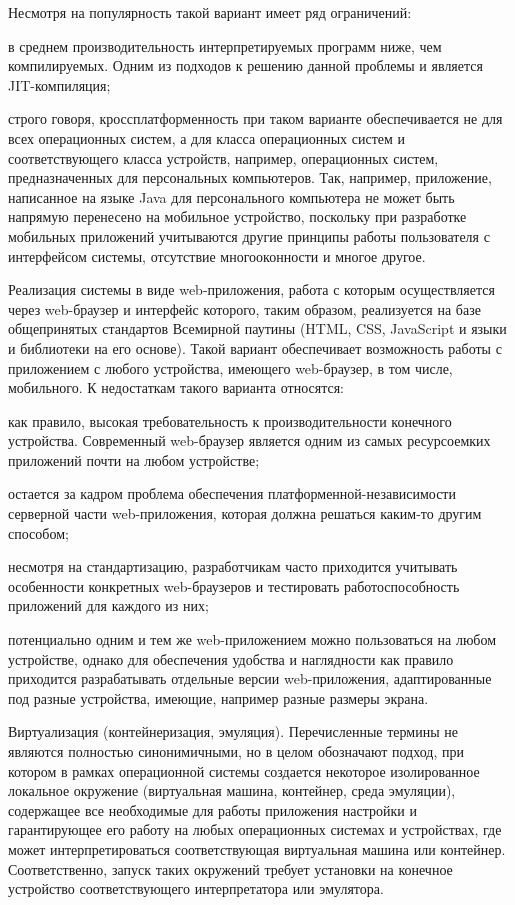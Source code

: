 \begin{textitemize}
	Несмотря на популярность такой вариант имеет ряд ограничений:
	\begin{textitemize}
		\item в среднем производительность интерпретируемых программ ниже, чем компилируемых. Одним из подходов к решению данной проблемы и является JIT-компиляция;
		\item строго говоря, кроссплатформенность при таком варианте обеспечивается не для всех операционных систем, а для класса операционных систем и соответствующего класса устройств, например, операционных систем, предназначенных для персональных компьютеров. Так, например, приложение, написанное на языке Java для персонального компьютера не может быть напрямую перенесено на мобильное устройство, поскольку при разработке мобильных приложений учитываются другие принципы работы пользователя с интерфейсом системы, отсутствие многооконности и многое другое.
	\end{textitemize}
	\item Реализация системы в виде web-приложения, работа с которым осуществляется через web-браузер и интерфейс которого, таким образом, реализуется на базе общепринятых стандартов Всемирной паутины (HTML, CSS, JavaScript и языки и библиотеки на его основе). Такой вариант обеспечивает возможность работы с приложением с любого устройства, имеющего web-браузер, в том числе, мобильного. К недостаткам такого варианта относятся:
	\begin{textitemize}
		\item как правило, высокая требовательность к производительности конечного устройства. Современный web-браузер является одним из самых ресурсоемких приложений почти на любом устройстве;
		\item остается за кадром проблема обеспечения платформенной-независимости серверной части web-приложения, которая должна решаться каким-то другим способом;
		\item несмотря на стандартизацию, разработчикам часто приходится учитывать особенности конкретных web-браузеров и тестировать работоспособность приложений для каждого из них;
		\item потенциально одним и тем же web-приложением можно пользоваться на любом устройстве, однако для обеспечения удобства и наглядности как правило приходится разрабатывать отдельные версии web-приложения, адаптированные под разные устройства, имеющие, например разные размеры экрана.
	\end{textitemize}
	\item Виртуализация (контейнеризация, эмуляция). Перечисленные термины не являются полностью синонимичными, но в целом обозначают подход, при котором в рамках операционной системы создается некоторое изолированное локальное окружение (виртуальная машина, контейнер, среда эмуляции), содержащее все необходимые для работы приложения настройки и гарантирующее его работу на любых операционных системах и устройствах, где может интерпретироваться соответствующая виртуальная машина или контейнер. Соответственно, запуск таких окружений требует установки на конечное устройство соответствующего интерпретатора или эмулятора.
	

\end{textitemize}
